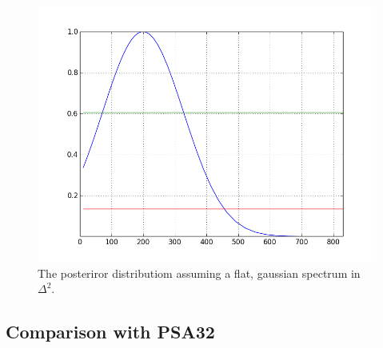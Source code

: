 \documentclass[twocolumn,numberedappendix]{emulateapj} \shorttitle{PSA64}
\begin{document}
\begin{figure}[h!]\centering
\includegraphics[width=\columnwidth]{plots/flat_k3pk_posterior.png}
\caption{The posteriror distributiom assuming a flat, gaussian spectrum in $\Delta^{2}$.}
\label{fig:final_posterioir}
\end{figure}



\subsection{Comparison with PSA32}
%
%
%
%
%
%
%
\end{document}

